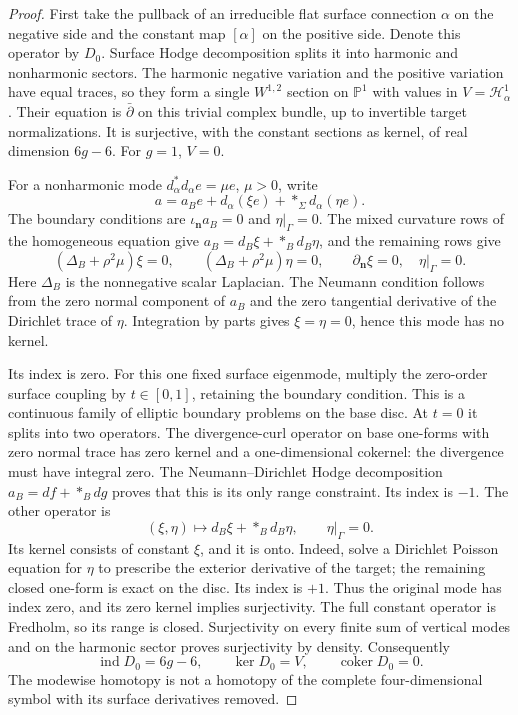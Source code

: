 \documentclass[11pt]{amsart}
\theoremstyle{definition}
\theoremstyle{remark}
\theoremstyle{plain}
\newcommand{\PP}{\mathbb{P}}
\newcommand{\ind}{\operatorname{ind}}
\begin{document}
\begin{proof}
First take the pullback of an irreducible flat surface connection
$\alpha$ on the negative side and the constant map $[\alpha]$ on the
positive side. Denote this operator by $D_0$. Surface Hodge decomposition
splits it into harmonic and nonharmonic sectors. The harmonic negative
variation and the positive variation have equal traces, so they form a
single $W^{1,2}$ section on $\PP^1$ with values in
$V=\mathcal H^1_\alpha$. Their equation is $\bar\partial$ on this
trivial complex bundle, up to invertible target normalizations. It is
surjective, with the constant sections as kernel, of real dimension
$6g-6$. For $g=1$, $V=0$.

For a nonharmonic mode $d_\alpha^*d_\alpha e=\mu e$, $\mu>0$, write
\[
 a=a_Be+d_\alpha(\xi e)+*_\Sigma d_\alpha(\eta e).
\]
The boundary conditions are
$\iota_{\mathbf n}a_B=0$ and $\eta|_\Gamma=0$.
The mixed curvature rows of the homogeneous equation give
$a_B=d_B\xi+*_Bd_B\eta$, and the remaining rows give
\begin{equation}\label{eq:compact-mode-poisson}
 (\Delta_B+\rho^2\mu)\xi=0,\qquad
 (\Delta_B+\rho^2\mu)\eta=0,
 \qquad \partial_{\mathbf n}\xi=0,\quad\eta|_\Gamma=0.
\end{equation}
Here $\Delta_B$ is the nonnegative scalar Laplacian. The Neumann condition
follows from the zero normal component of $a_B$ and the zero tangential
derivative of the Dirichlet trace of $\eta$. Integration by parts gives
$\xi=\eta=0$, hence this mode has no kernel.

Its index is zero. For this one fixed surface eigenmode, multiply the
zero-order surface coupling by $t\in[0,1]$, retaining the boundary
condition. This is a continuous family of elliptic boundary problems on
the base disc. At $t=0$ it splits into two operators. The divergence-curl
operator on base one-forms with zero normal trace has zero kernel and a
one-dimensional cokernel: the divergence must have integral zero. The
Neumann--Dirichlet Hodge decomposition $a_B=df+*_Bdg$ proves that this
is its only range constraint. Its index is $-1$. The other operator is
\[
 (\xi,\eta)\longmapsto d_B\xi+*_Bd_B\eta,
 \qquad \eta|_\Gamma=0.
\]
Its kernel consists of constant $\xi$, and it is onto. Indeed, solve a
Dirichlet Poisson equation for $\eta$ to prescribe the exterior derivative
of the target; the remaining closed one-form is exact on the disc. Its
index is $+1$. Thus the original mode has index zero, and its zero kernel
implies surjectivity. The full constant operator is Fredholm, so its
range is closed. Surjectivity on every finite sum of vertical modes and
on the harmonic sector proves surjectivity by density. Consequently
\begin{equation}\label{eq:constant-mixed-index}
 \ind D_0=6g-6,\qquad \ker D_0=V,\qquad\operatorname{coker}D_0=0.
\end{equation}
The modewise homotopy is not a homotopy of the complete four-dimensional
symbol with its surface derivatives removed.


\end{proof}
\end{document}
